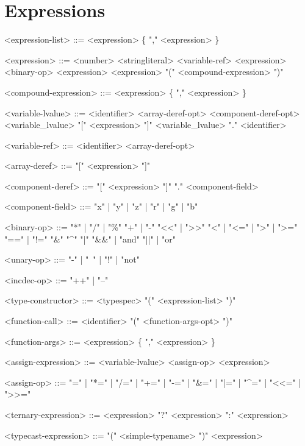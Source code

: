 \documentclass[11pt,letterpaper]{book}
\begin{document}
\section*{Expressions}
\begin{grammar}

<expression-list> ::= <expression> \{ "," <expression> \}

<expression> ::= <number>
\alt <stringliteral>
 <variable-ref>
\alt <expression> <binary-op> <expression>
 <expression>
\alt "(" <compound-expression> ")"

<compound-expression> ::= <expression> \{ "," <expression> \}

<variable-lvalue> ::= <identifier> <array-deref-opt> <component-deref-opt>
\alt <variable_lvalue> "[" <expression> "]"
\alt <variable_lvalue> "." <identifier>

<variable-ref> ::= <identifier> <array-deref-opt> 

<array-deref> ::= "[" <expression> "]"

<component-deref> ::= "[" <expression> "]"
\alt "." <component-field>

<component-field> ::= "x" | "y" | "z" | "r" | "g" | "b"

<binary-op> ::= "*" | "/" | "\%"
\alt "+" | "-" 
\alt "<<" | ">>"
\alt "<" | "<=" | ">" | ">=" 
\alt "==" | "!=" 
\alt "&"
\alt "^"
\alt "|"
\alt "&&" | "and"
\alt "||" | "or"

<unary-op> ::= "-" | "~" | "!" | "not"

<incdec-op> ::= "++" | "--"

<type-constructor> ::= <typespec> "(" <expression-list> ")"

<function-call> ::= <identifier> "(" <function-args-opt> ")"

<function-args> ::= <expression> \{ "," <expression> \}

<assign-expression> ::= <variable-lvalue> <assign-op> <expression>

<assign-op> ::= "=" | "*=" | "/=" | "+=" | "-=" | "&=" | "|=" | "^=" |
"<<=" | ">>="

<ternary-expression> ::= <expression> "?" <expression> ":" <expression>

<typecast-expression> ::= "(" <simple-typename> ")" <expression>

\end{grammar}
\end{document}
